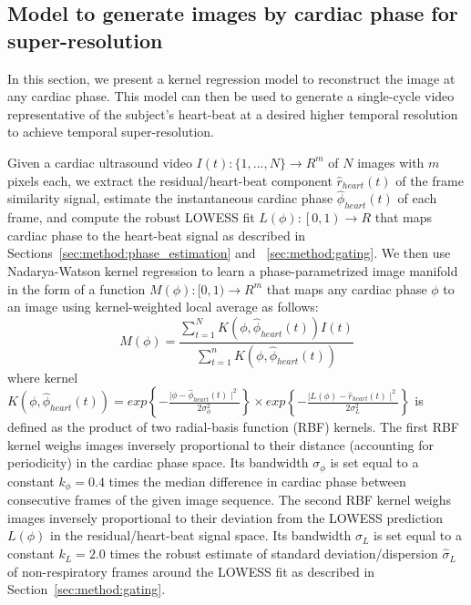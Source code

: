 \documentclass[runningheads,a4paper]{llncs}
\begin{document}
\subsection{Model to generate images by cardiac phase for super-resolution}
\label{sec:method:super_resolution}
%
In this section, we present a kernel regression model to reconstruct the image at any cardiac phase. This model can then be used to generate a single-cycle video representative of the subject's heart-beat at a desired higher temporal resolution to achieve temporal super-resolution.

Given a cardiac ultrasound video $I(t) : \{1, ..., N\} \to R^m$ of $N$ images with $m$ pixels each, we extract the residual/heart-beat component $\hat{r}_{heart}(t)$ of the frame similarity signal, estimate the instantaneous cardiac phase $\hat{\phi}_{heart}(t)$ of each frame, and compute the robust LOWESS fit $L(\phi) : \left [  0, 1\right ) \to R$ that maps cardiac phase to the heart-beat signal as  described in Sections~\ref{sec:method:phase_estimation} and ~\ref{sec:method:gating}. We then use Nadarya-Watson kernel regression\cite{Bishop2006} to learn a phase-parametrized image manifold in the form of a function $M(\phi): [0, 1) \to R^m $ that maps any cardiac phase $\phi$ to an image using kernel-weighted local average as follows:
\begin{equation}
M(\phi) = \frac{\sum_{t = 1}^{N} K \left( \phi, \hat{\phi}_{heart}(t) \right) I(t)}{\sum_{t = 1}^{n} K \left( \phi, \hat{\phi}_{heart}(t) \right)} 
\end{equation}
where kernel $K\left( \phi, \hat{\phi}_{heart}(t) \right) = exp\left \{ -\frac{ \mid \phi - \hat{\phi}_{heart}(t) \mid^2}{2  \sigma^2_\phi} \right \} \times exp\left \{ -\frac{ \mid L(\phi) - \hat{r}_{heart}(t) \mid^2}{2  \sigma^2_{L}} \right \}$ is defined as the product of two radial-basis function (RBF) kernels. The first RBF kernel  weighs images inversely proportional to their distance (accounting for periodicity) in the cardiac phase space. Its bandwidth $\sigma_\phi$ is set equal to a constant $k_\phi = 0.4$ times the median difference in cardiac phase between consecutive frames of the given image sequence. The second RBF kernel weighs images inversely proportional to their deviation from the LOWESS prediction $L(\phi)$ in the residual/heart-beat signal space. Its bandwidth $\sigma_{L}$ is set equal to a constant $k_L = 2.0$ times the robust estimate of standard deviation/dispersion $\hat{\sigma}_{L}$ of non-respiratory frames around the LOWESS fit as described in Section~\ref{sec:method:gating}.
\end{document}
